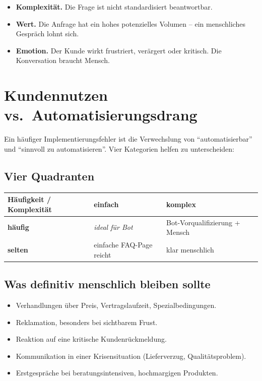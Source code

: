 \documentclass[11pt,a4paper,oneside]{article}
\begin{document}
\begin{itemize}
  \item \textbf{Komplexität.} Die Frage ist nicht standardisiert beantwortbar.
  \item \textbf{Wert.} Die Anfrage hat ein hohes potenzielles Volumen -- ein menschliches Gespräch lohnt sich.
  \item \textbf{Emotion.} Der Kunde wirkt frustriert, verärgert oder kritisch. Die Konversation braucht Mensch.
\end{itemize}

\section{Kundennutzen vs.\ Automatisierungsdrang}

Ein häufiger Implementierungsfehler ist die Verwechslung von ``automatisierbar'' und ``sinnvoll zu automatisieren''. Vier Kategorien helfen zu unterscheiden:

\subsection{Vier Quadranten}

\begin{tabularx}{\linewidth}{@{}>{\bfseries}lXX@{}}
\toprule
Häufigkeit / Komplexität & einfach & komplex \\
\midrule
häufig & \emph{ideal für Bot} & Bot-Vorqualifizierung + Mensch \\
selten & einfache FAQ-Page reicht & klar menschlich \\
\bottomrule
\end{tabularx}

\subsection{Was definitiv menschlich bleiben sollte}

\begin{itemize}
  \item Verhandlungen über Preis, Vertragslaufzeit, Spezialbedingungen.
  \item Reklamation, besonders bei sichtbarem Frust.
  \item Reaktion auf eine kritische Kundenrückmeldung.
  \item Kommunikation in einer Krisensituation (Lieferverzug, Qualitätsproblem).
  \item Erstgespräche bei beratungsintensiven, hochmargigen Produkten.
\end{itemize}
\end{document}
